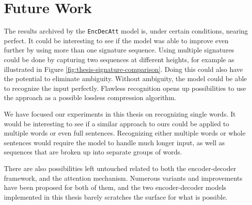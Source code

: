 
\section{Future Work}
\label{sec:future_work}
The results archived by the {\tt EncDecAtt} model is, under certain conditions, nearing perfect. It could be interesting to see if the model was able to improve even further by using more than one signature sequence. Using multiple signatures could be done by capturing two sequences at different heights, for example as illustrated in Figure \ref{fig:thesis-signature-comparison}. Doing this could also have the potential to eliminate ambiguity. Without ambiguity, the model could be able to recognize the input perfectly. Flawless recognition opens up possibilities to use the approach as a possible lossless compression algorithm.

We have focused our experiments in this thesis on recognizing single words. It would be interesting to see if a similar approach to ours could be applied to multiple words or even full sentences. Recognizing either multiple words or whole sentences would require the model to handle much longer input, as well as sequences that are broken up into separate groups of words.

There are also possibilities left untouched related to both the encoder-decoder framework, and the attention mechanism. Numerous variants and improvements have been proposed for both of them, and the two encoder-decoder models implemented in this thesis barely scratches the surface for what is possible.